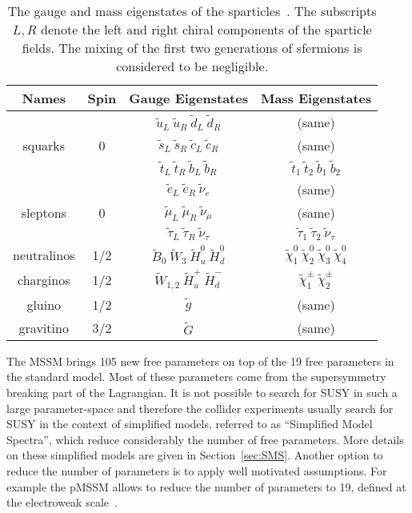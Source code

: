 \begin{table}[h]
\begin{center}
\begin{tabular}{|c|c|c|c|}
\hline
Names & Spin  & Gauge Eigenstates & Mass Eigenstates  \\
\hline
      \rule{0pt}{3ex}   &   & $\tilde{u}_{L}~\tilde{u}_{R}~\tilde{d}_{L}~\tilde{d}_{R}$  & (same) \\
squarks & 0 & $\tilde{s}_{L}~\tilde{s}_{R}~\tilde{c}_{L}~\tilde{c}_{R}$  & (same) \\
        &   & $\tilde{t}_{L}~\tilde{t}_{R}~\tilde{b}_{L}~\tilde{b}_{R}$  & $\tilde{t}_{1}~\tilde{t}_{2}~\tilde{b}_{1}~\tilde{b}_{2}$ \\
\hline
         &   & $\tilde{e}_{L}~\tilde{e}_{R}~\tilde{\nu}_{e}$  & (same) \\
sleptons & 0 & $\tilde{\mu}_{L}~\tilde{\mu}_{R}~\tilde{\nu}_{\mu}$  & (same) \\
         &   & $\tilde{\tau}_{L}~\tilde{\tau}_{R}~\tilde{\nu}_{\tau}$  & $\tilde{\tau}_{1}~\tilde{\tau}_{2}~\tilde{\nu}_{\tau}$ \\
\hline
neutralinos \rule{0pt}{3ex} & 1/2 & $\tilde{B}_{0}~\tilde{W}_{3}~\tilde{H}_{u}^{0}~\tilde{H}_{d}^{0}$  & $\tilde{\chi}_{1}^{0}~\tilde{\chi}_{2}^{0}~\tilde{\chi}_{3}^{0}~\tilde{\chi}_{4}^{0} $ \\
\hline
charginos  \rule{0pt}{3ex} & 1/2 & $\tilde{W}_{1,2}~\tilde{H}_{u}^{+}~\tilde{H}_{d}^{-}$  & $\tilde{\chi}_{1}^{\pm}~\tilde{\chi}_{2}^{\pm} $ \\
\hline 
gluino & 1/2 & $\tilde{g}$  & (same) \\
\hline
gravitino  \rule{0pt}{3ex} & 3/2 & $\tilde{G}$  & (same) \\
\hline
\end{tabular}
\caption[Table caption text]{The gauge and mass eigenstates of the sparticles~\cite{Martin:1997ns}. The subscripts $L,R$ denote the left and right chiral components of the sparticle fields. The mixing of the first two generations of sfermions is considered to be negligible. }
\label{tab:SUSYspectrum}
\end{center}
\end{table}

The MSSM brings 105 new free parameters on top of the 19 free parameters in the standard model. Most of these parameters come from the supersymmetry breaking part of the Lagrangian. It is not possible to search for SUSY in such a large parameter-space and therefore the collider experiments usually search for SUSY in the context of simplified models, referred to as ``Simplified Model Spectra'', which reduce considerably the number of free parameters. More details on these simplified models are given in Section~\ref{sec:SMS}. Another option to reduce the number of parameters is to apply well motivated assumptions. For example the pMSSM allows to reduce the number of parameters to 19, defined at the electroweak scale~\cite{Berger:2008cq}.

